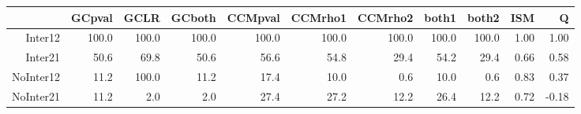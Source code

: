 \begin{table}[ht]
\centering
\begin{tabular}{rrrrrrrrrrr}
  \hline
 & GCpval & GCLR & GCboth & CCMpval & CCMrho1 & CCMrho2 & both1 & both2 & ISM & Q \\ 
  \hline
Inter12 & 100.0 & 100.0 & 100.0 & 100.0 & 100.0 & 100.0 & 100.0 & 100.0 & 1.00 & 1.00 \\ 
  Inter21 & 50.6 & 69.8 & 50.6 & 56.6 & 54.8 & 29.4 & 54.2 & 29.4 & 0.66 & 0.58 \\ 
  NoInter12 & 11.2 & 100.0 & 11.2 & 17.4 & 10.0 & 0.6 & 10.0 & 0.6 & 0.83 & 0.37 \\ 
  NoInter21 & 11.2 & 2.0 & 2.0 & 27.4 & 27.2 & 12.2 & 26.4 & 12.2 & 0.72 & -0.18 \\ 
   \hline
\end{tabular}
\end{table}
